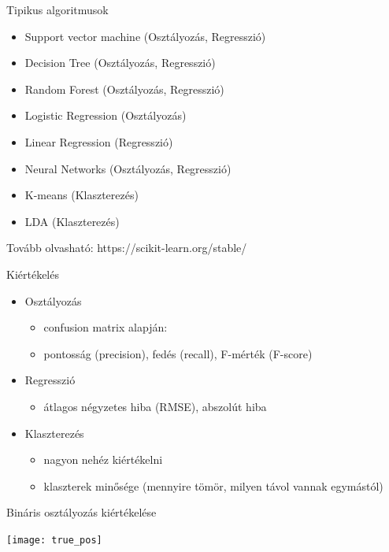 \documentclass[bigger]{beamer}
\begin{document}
\begin{frame}{Tipikus algoritmusok}
\begin{itemize}
	\item Support vector machine (Osztályozás, Regresszió)
	\item Decision Tree (Osztályozás, Regresszió)
	\item Random Forest (Osztályozás, Regresszió)
	\item Logistic Regression (Osztályozás)
	\item Linear Regression (Regresszió)
	\item Neural Networks (Osztályozás, Regresszió)
	\item K-means (Klaszterezés)
	\item LDA (Klaszterezés)

\end{itemize}

\footnotesize{Tovább olvasható: https://scikit-learn.org/stable/}
\end{frame}

\begin{frame}{Kiértékelés}
    \begin{itemize}
        \item Osztályozás
            \begin{itemize}
                \item confusion matrix alapján:
                \item pontosság (precision), fedés (recall), F-mérték (F-score)
            \end{itemize}
        \item Regresszió
            \begin{itemize}
                \item átlagos négyzetes hiba (RMSE), abszolút hiba
            \end{itemize}
        \item Klaszterezés
            \begin{itemize}
                \item nagyon nehéz kiértékelni
                \item klaszterek minősége (mennyire tömör, milyen távol vannak egymástól)
            \end{itemize}
    \end{itemize}
\end{frame}

\begin{frame}{Bináris osztályozás kiértékelése}

    \begin{center}
\texttt{[image: true\_pos]}
    \end{center}

\end{frame}
\end{document}
